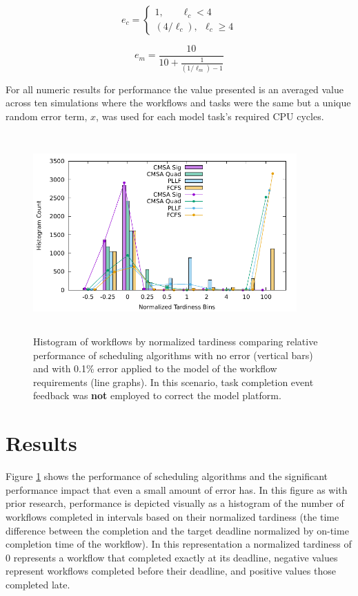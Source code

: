 \documentclass[10pt]{csce}
\begin{document}
\begin{equation}
\label{eq:cpueff}
e_c = \begin{cases}
	1, ~~~~~~~~\ell_c < 4 \\
	(4/\ell_c), ~~\ell_c \ge 4
\end{cases}
\end{equation}

\begin{equation}
\label{eq:memeff}
e_m = \frac{10}{10 + \frac{1}{(1/\ell_m) - 1}}
\end{equation}

For all numeric results for
performance the value presented is an averaged value across ten simulations
where the workflows and tasks were the same but a unique random error term,
$x$, was used for each model task's required CPU cycles.

\begin{figure}
	\begin{center}
		\includegraphics[width=0.9\textwidth,height=3in]{figures/Histogram_All_NoLoss_NoBias_LowError.pdf}
	\end{center}
	\caption{Histogram of workflows by normalized tardiness comparing
		relative performance of scheduling algorithms with no error (vertical
		bars) and with 0.1\% error applied to the model of the workflow
		requirements (line graphs).  In this scenario, task completion event
		feedback was \textbf{not} employed to correct the model platform.}
	\label{fig:noloss-lowerror-nofeedback}
\end{figure}


\section{Results}
\label{sec:Results}

Figure \ref{fig:noloss-lowerror-nofeedback} shows the performance of scheduling
algorithms and the significant performance impact that even a small amount of
error has.  In this figure as with prior research, performance is depicted
visually as a histogram of the number of workflows completed in intervals based
on their normalized tardiness (the time difference between the completion and
the target deadline normalized by on-time completion time of the workflow).
In this representation a normalized tardiness of 0 represents a workflow that
completed exactly at its deadline, negative values represent workflows completed
before their deadline, and positive values those completed late.
\end{document}
